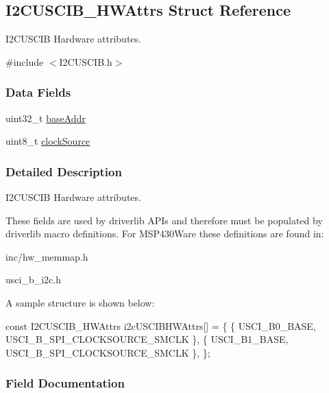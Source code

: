 \subsection{I2\+C\+U\+S\+C\+I\+B\+\_\+\+H\+W\+Attrs Struct Reference}
\label{struct_i2_c_u_s_c_i_b___h_w_attrs}


I2\+C\+U\+S\+C\+I\+B Hardware attributes.  




{\ttfamily \#include $<$I2\+C\+U\+S\+C\+I\+B.\+h$>$}

\subsubsection*{Data Fields}
\begin{DoxyCompactItemize}
\item 
uint32\+\_\+t \hyperlink{struct_i2_c_u_s_c_i_b___h_w_attrs_ac86e653a2babe8e0e8c20d044d7f87ad}{base\+Addr}
\item 
uint8\+\_\+t \hyperlink{struct_i2_c_u_s_c_i_b___h_w_attrs_aca93346c6e87c42ee11c3742bd85e79d}{clock\+Source}
\end{DoxyCompactItemize}


\subsubsection{Detailed Description}
I2\+C\+U\+S\+C\+I\+B Hardware attributes. 

These fields are used by driverlib A\+P\+Is and therefore must be populated by driverlib macro definitions. For M\+S\+P430\+Ware these definitions are found in\+:
\begin{DoxyItemize}
\item inc/hw\+\_\+memmap.\+h
\item usci\+\_\+b\+\_\+i2c.\+h
\end{DoxyItemize}

A sample structure is shown below\+: 
\begin{DoxyCode}
\textcolor{keyword}{const} I2CUSCIB_HWAttrs i2cUSCIBHWAttrs[] = \{
    \{
        USCI\_B0\_BASE,
        USCI\_B\_SPI\_CLOCKSOURCE\_SMCLK
    \},
    \{
        USCI\_B1\_BASE,
        USCI\_B\_SPI\_CLOCKSOURCE\_SMCLK
    \},
\};
\end{DoxyCode}
 

\subsubsection{Field Documentation}
